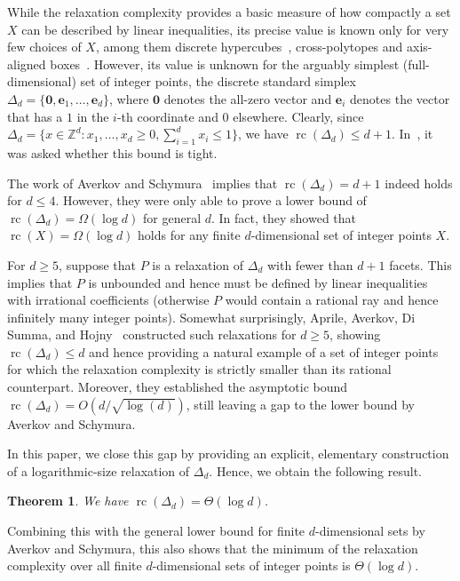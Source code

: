 \documentclass[11pt]{article}
\newcommand{\rc}{\operatorname{rc}}
\newcommand{\Z}{\mathbb{Z}}
\newcommand{\zero}{\mathbf{0}}
\newcommand{\unit}{\mathbf{e}}
\newtheorem{theorem}{Theorem}[section]
\begin{document}
While the relaxation complexity provides a basic measure of how compactly a set $X$ can be described by linear inequalities, its precise value is known only for very few choices of $X$, among them discrete hypercubes~\cite{Kaibel2015}, cross-polytopes and axis-aligned boxes~\cite{Averkov2023a}.
However, its value is unknown for the arguably simplest (full-dimensional) set of integer points, the discrete standard simplex $\Delta_d = \{\zero, \unit_1, \dots, \unit_d\}$, where $\zero$ denotes the all-zero vector and $\unit_i$ denotes the vector that has a $1$ in the $i$-th coordinate and $0$ elsewhere.
Clearly, since $\Delta_d = \{x \in \Z^d : x_1,\dots,x_d \ge 0, \sum_{i=1}^d x_i \le 1\}$, we have $\rc(\Delta_d) \le d + 1$.
In~\cite{Kaibel2015}, it was asked whether this bound is tight.

The work of Averkov and Schymura~\cite{Averkov2022} implies that $\rc(\Delta_d) = d + 1$ indeed holds for $d \leq 4$.
However, they were only able to prove a lower bound of $\rc(\Delta_d) = \Omega(\log d)$ for general $d$.
In fact, they showed that $\rc(X) = \Omega(\log d)$ holds for any finite $d$-dimensional set of integer points $X$.

For $d \ge 5$, suppose that $P$ is a relaxation of $\Delta_d$ with fewer than $d + 1$ facets.
This implies that $P$ is unbounded and hence must be defined by linear inequalities with irrational coefficients (otherwise $P$ would contain a rational ray and hence infinitely many integer points).
Somewhat surprisingly, Aprile, Averkov, Di Summa, and Hojny~\cite{Aprile2024} constructed such relaxations for $d \ge 5$, showing $\rc(\Delta_d) \le d$ and hence providing a natural example of a set of integer points for which the relaxation complexity is strictly smaller than its rational counterpart.
Moreover, they established the asymptotic bound $\rc(\Delta_d) = O(d / \sqrt{\log(d)})$, still leaving a gap to the lower bound by Averkov and Schymura.

In this paper, we close this gap by providing an explicit, elementary construction of a loga\-rithmic-size relaxation of $\Delta_d$.
Hence, we obtain the following result.
\begin{theorem}
    \label{thmMain}
    We have $\rc(\Delta_d) = \Theta(\log d)$.
\end{theorem}
Combining this with the general lower bound for finite $d$-dimensional sets by Averkov and Schymura, this also shows that the minimum of the relaxation complexity over all finite $d$-dimensional sets of integer points is $\Theta(\log d)$.
\end{document}
